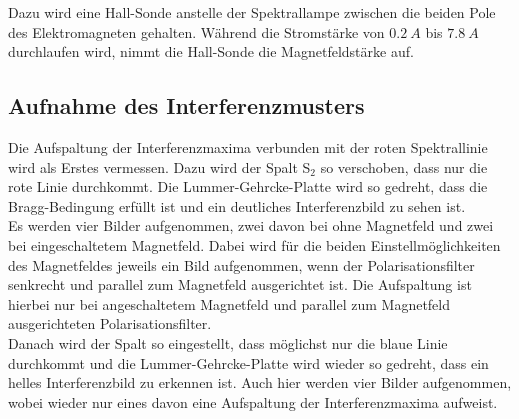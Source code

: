     Dazu wird eine Hall-Sonde anstelle der Spektrallampe zwischen die beiden Pole des Elektromagneten gehalten.
    Während die Stromstärke von $\SI{0,2}{A}$ bis $\SI{7,8}{A}$ durchlaufen wird, nimmt die Hall-Sonde die Magnetfeldstärke auf.

\subsection{Aufnahme des Interferenzmusters}
    Die Aufspaltung der Interferenzmaxima verbunden mit der roten Spektrallinie wird als Erstes vermessen.
    Dazu wird der Spalt S$_2$ so verschoben, dass nur die rote Linie durchkommt.
    Die Lummer-Gehrcke-Platte wird so gedreht, dass die Bragg-Bedingung erfüllt ist und ein deutliches Interferenzbild zu sehen ist.
    \\

    Es werden vier Bilder aufgenommen, zwei davon bei ohne Magnetfeld und zwei bei eingeschaltetem Magnetfeld.
    Dabei wird für die beiden Einstellmöglichkeiten des Magnetfeldes jeweils ein Bild aufgenommen, wenn der Polarisationsfilter senkrecht und parallel zum Magnetfeld ausgerichtet ist.
    Die Aufspaltung ist hierbei nur bei angeschaltetem Magnetfeld und parallel zum Magnetfeld ausgerichteten Polarisationsfilter.
    \\

    Danach wird der Spalt so eingestellt, dass möglichst nur die blaue Linie durchkommt und die Lummer-Gehrcke-Platte wird wieder so gedreht, dass ein helles Interferenzbild zu erkennen ist.
    Auch hier werden vier Bilder aufgenommen, wobei wieder nur eines davon eine Aufspaltung der Interferenzmaxima aufweist.
